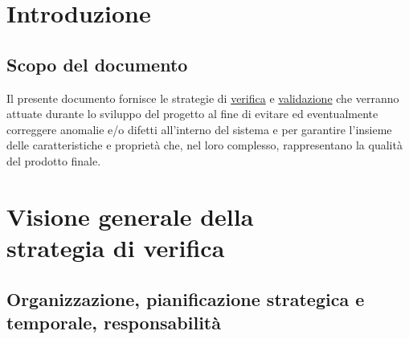 \tableofcontents

\chapter{Introduzione}
\thispagestyle{fancy} %

\section{Scopo del documento}

Il presente documento fornisce le strategie di \underline{verifica} e
\underline{validazione} che verranno attuate durante lo sviluppo del progetto al
fine di evitare ed eventualmente correggere anomalie e/o difetti all'interno del
sistema e per garantire l'insieme delle caratteristiche e propriet\`a che, nel
loro complesso, rappresentano la qualit\`a del prodotto finale.




\chapter{Visione generale della \\strategia di verifica}
\thispagestyle{fancy} %

\section{Organizzazione, pianificazione strategica e \\temporale,
responsabilit\`a}

